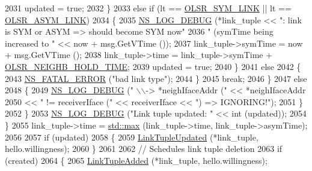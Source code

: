 \begin{DoxyCode}
2031                   updated = \textcolor{keyword}{true};
2032                 \}
2033               \textcolor{keywordflow}{else} \textcolor{keywordflow}{if} (lt == \hyperlink{olsr-routing-protocol_8cc_aa7acefeda0e22f22d9ca6b9f445859d7}{OLSR\_SYM\_LINK} || lt == \hyperlink{olsr-routing-protocol_8cc_a8ebf1daea9834b2e4dfb42ca05b05f4a}{OLSR\_ASYM\_LINK})
2034                 \{
2035                   \hyperlink{group__logging_ga413f1886406d49f59a6a0a89b77b4d0a}{NS\_LOG\_DEBUG} (*link\_tuple << \textcolor{stringliteral}{": link is SYM or ASYM => should become SYM now"}
2036                                 \textcolor{stringliteral}{" (symTime being increased to "} << now + msg.GetVTime ());
2037                   link\_tuple->symTime = now + msg.GetVTime ();
2038                   link\_tuple->time = link\_tuple->symTime + \hyperlink{olsr-routing-protocol_8cc_a32428f0b560f93c0a160b27181704faa}{OLSR\_NEIGHB\_HOLD\_TIME};
2039                   updated = \textcolor{keyword}{true};
2040                 \}
2041               \textcolor{keywordflow}{else}
2042                 \{
2043                   \hyperlink{group__fatal_ga5131d5e3f75d7d4cbfd706ac456fdc85}{NS\_FATAL\_ERROR} (\textcolor{stringliteral}{"bad link type"});
2044                 \}
2045               \textcolor{keywordflow}{break};
2046             \}
2047           \textcolor{keywordflow}{else}
2048             \{
2049               \hyperlink{group__logging_ga413f1886406d49f59a6a0a89b77b4d0a}{NS\_LOG\_DEBUG} (\textcolor{stringliteral}{"     \(\backslash\)\(\backslash\)-> *neighIfaceAddr ("} << *neighIfaceAddr
2050                                                           << \textcolor{stringliteral}{" != receiverIface ("} << receiverIface << \textcolor{stringliteral}{")
       => IGNORING!"});
2051             \}
2052         \}
2053       \hyperlink{group__logging_ga413f1886406d49f59a6a0a89b77b4d0a}{NS\_LOG\_DEBUG} (\textcolor{stringliteral}{"Link tuple updated: "} << \textcolor{keywordtype}{int} (updated));
2054     \}
2055   link\_tuple->time = \hyperlink{80211b_8c_affe776513b24d84b39af8ab0930fef7f}{std::max} (link\_tuple->time, link\_tuple->asymTime);
2056 
2057   \textcolor{keywordflow}{if} (updated)
2058     \{
2059       \hyperlink{classns3_1_1olsr_1_1RoutingProtocol_a00df90e72ca9f8de10b6f7859fb730eb}{LinkTupleUpdated} (*link\_tuple, hello.willingness);
2060     \}
2061 
2062   \textcolor{comment}{// Schedules link tuple deletion}
2063   \textcolor{keywordflow}{if} (created)
2064     \{
2065       \hyperlink{classns3_1_1olsr_1_1RoutingProtocol_a49feb372260a7d855e02c789e584d5db}{LinkTupleAdded} (*link\_tuple, hello.willingness);

\end{DoxyCode}
